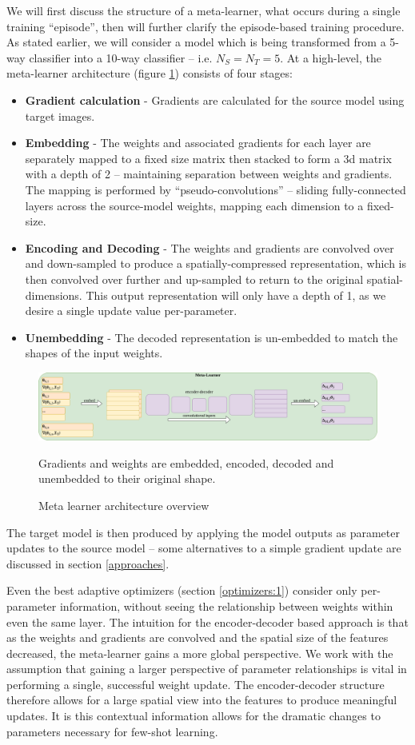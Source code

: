 \documentclass{report}
\begin{document}
We will first discuss the structure of a meta-learner, what occurs during a single training ``episode'', then will further clarify the episode-based training procedure. As stated earlier, we will consider a model which is being transformed from a 5-way classifier into a 10-way classifier -- i.e. $N_{S} = N_{T} = 5$. At a high-level, the meta-learner architecture (figure \ref{fig:ml:3}) consists of four stages:
\begin{itemize}
	\item \textbf{Gradient calculation} - Gradients are calculated for the source model using target images.
	\item \textbf{Embedding} - The weights and associated gradients for each layer are separately mapped to a fixed size matrix then stacked to form a 3d matrix with a depth of 2 -- maintaining separation between weights and gradients. The mapping is performed by ``pseudo-convolutions'' -- sliding fully-connected layers across the source-model weights, mapping each dimension to a fixed-size.
	\item \textbf{Encoding and Decoding} - The weights and gradients are convolved over and down-sampled to produce a spatially-compressed representation, which is then convolved over further and up-sampled to return to the original spatial-dimensions. This output representation will only have a depth of 1, as we desire a single update value per-parameter.
	\item \textbf{Unembedding} - The decoded representation is un-embedded to match the shapes of the input weights.
\end{itemize}
\begin{figure}[h!]
	\centering
	\includegraphics[width=17cm]{metalearnerarchitecture}
	\caption{Meta learner architecture overview}
	\label{fig:ml:3}
	Gradients and weights are embedded, encoded, decoded and unembedded to their original shape.
\end{figure}
The target model is then produced by applying the model outputs as parameter updates to the source model -- some alternatives to a simple gradient update are discussed in section \ref{approaches}. \par
Even the best adaptive optimizers (section \ref{optimizers:1}) consider only per-parameter information, without seeing the relationship between weights within even the same layer. The intuition for the encoder-decoder based approach is that as the weights and gradients are convolved and the spatial size of the features decreased, the meta-learner gains a more global perspective. We work with the assumption that gaining a larger perspective of parameter relationships is vital in performing a single, successful weight update. The encoder-decoder structure therefore allows for a large spatial view into the features to produce meaningful updates. It is this contextual information allows for the dramatic changes to parameters necessary for few-shot learning. \par
\end{document}
